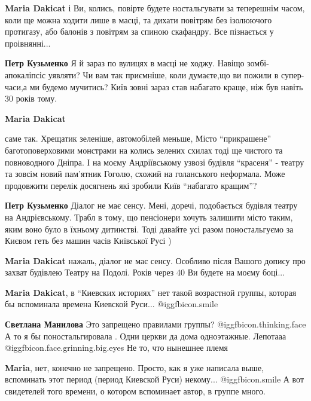 \begin{itemize}
\begin{itemize} %
\textbf{Maria Dakicat} і Ви, колись, повірте будете ностальгувати за теперешнім часом, коли ще можна ходити лише в масці, та дихати повітрям без ізолюючого протигазу, або балонів з повітрям за спиною скафандру. Все пізнається у проівнянні...

\begin{itemize} %
\textbf{Петр Кузьменко} Я й зараз по вулицях в масці не ходжу. Навіщо зомбі-апокаліпсіс уявляти? Чи вам так приємніше, коли думаєте,що ви пожили в супер-часи,а ми будемо мучитись? Київ зовні зараз став набагато краще, ніж був навіть 30 років тому.

\textbf{Maria Dakicat} 

саме так. Хрещатик зеленіше, автомобілей меньше, Місто \enquote{прикрашене}
баготоповерховими монстрами на колись зелених схилах тоді ще чистого та
повноводного Дніпра. І на моєму Андріївському узвозі будівля \enquote{красеня} - театру
та зовсім новий пам'ятник Гоголю, схожий на голанського неформала. Може
продовжити перелік досягнень які зробили Київ \enquote{набагато кращим}?

\textbf{Петр Кузьменко} Діалог не має сенсу. Мені, доречі, подобається будівля театру на Андрієвському. Трабл в тому, що пенсіонери хочуть залишити місто таким, яким воно було в їхньому дитинстві. Тоді давайте усі разом поностальгуємо за Києвом геть без машин часів Київської Русі )

\textbf{Maria Dakicat} нажаль, діалог не має сенсу. Особливо після Вашого допису про захват будівлею Театру на Подолі. Років через 40 Ви будете на моєму боці...

\textbf{Maria Dakicat}, в \enquote{Киевских историях} нет такой возрастной группы, которая бы вспоминала времена Киевской Руси... @igg{fbicon.smile} 

\textbf{Светлана Манилова} Это запрещено правилами группы?  @igg{fbicon.thinking.face} А то я бы поностальгировала . Одни церкви да дома одноэтажные. Лепотааа  @igg{fbicon.face.grinning.big.eyes}  Не то, что нынешнее племя

\textbf{Maria}, нет, конечно не запрещено. Просто, как я уже написала выше, вспоминать этот период (период Киевской Руси) некому... @igg{fbicon.smile} А вот свидетелей того времени, о котором вспоминает автор, в группе много.


\end{itemize}
\end{itemize}
\end{itemize}
